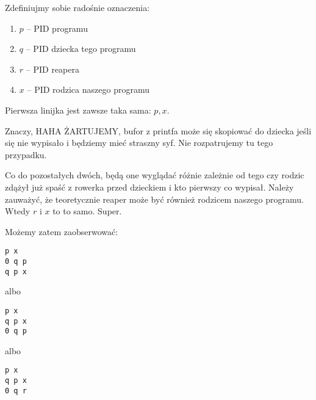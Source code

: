 Zdefiniujmy sobie radośnie oznaczenia:
\begin{enumerate}
    \item $p$ -- PID programu
    \item $q$ -- PID dziecka tego programu
    \item $r$ -- PID reapera
    \item $x$ -- PID rodzica naszego programu
\end{enumerate}

Pierwsza linijka jest zawsze taka sama: \(p, x\).

Znaczy, HAHA ŻARTUJEMY, bufor z printfa może się skopiować do dziecka jeśli się nie wypisało i będziemy mieć straszny syf. Nie rozpatrujemy tu tego przypadku.

Co do pozostałych dwóch, będą one wyglądać różnie zależnie od tego czy rodzic zdążył już spaść z rowerka przed dzieckiem i kto pierwszy co wypisał. Należy zauważyć, że teoretycznie reaper może być również rodzicem naszego programu. Wtedy $r$ i $x$ to to samo. Super.

Możemy zatem zaobserwować:

\texttt{p x \\ 0 q p \\ q p x}

albo

\texttt{p x \\ q p x \\ 0 q p}

albo

\texttt{p x \\ q p x \\ 0 q r}